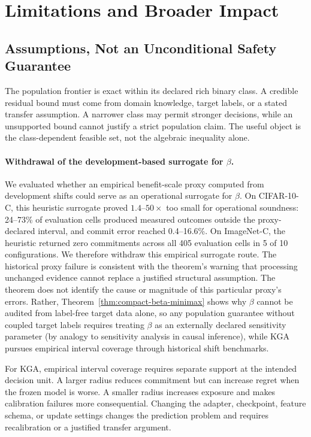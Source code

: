 \section{Limitations and Broader Impact}
\label{sec:compact-sensitivity}

\subsection{Assumptions, Not an Unconditional Safety Guarantee}

The population frontier is exact within its declared rich binary class. A credible residual bound
must come from domain knowledge, target labels, or a stated transfer assumption. A narrower class
may permit stronger decisions, while an unsupported bound cannot justify a strict population claim.
The useful object is the class-dependent feasible set, not the algebraic inequality alone.

\paragraph{Withdrawal of the development-based surrogate for $\beta$.}
\label{par:beta-surrogate-failure}
We evaluated whether an empirical benefit-scale proxy computed from development shifts could serve
as an operational surrogate for $\beta$. On CIFAR-10-C, this heuristic surrogate proved $1.4$--$50\times$
too small for operational soundness: 24--73\% of evaluation cells produced measured outcomes outside
the proxy-declared interval, and commit error reached 0.4--16.6\%. On ImageNet-C, the heuristic returned
zero commitments across all 405 evaluation cells in 5 of 10 configurations.
We therefore withdraw this empirical surrogate route. The historical proxy failure is consistent with
the theorem's warning that processing unchanged evidence cannot replace a justified structural assumption.
The theorem does not identify the cause or magnitude of this particular proxy's errors. Rather,
Theorem~\ref{thm:compact-beta-minimax} shows why $\beta$ cannot be audited from label-free target
data alone, so any population guarantee without coupled target labels requires treating $\beta$ as an
externally declared sensitivity parameter (by analogy to sensitivity analysis in causal inference), while
KGA pursues empirical interval coverage through historical shift benchmarks.

For KGA, empirical interval coverage requires separate support at the intended decision unit.
A larger radius reduces commitment but can increase regret when the frozen model is worse.
A smaller radius increases exposure and makes calibration failures more consequential.
Changing the adapter, checkpoint, feature schema, or update settings changes the prediction problem
and requires recalibration or a justified transfer argument.

